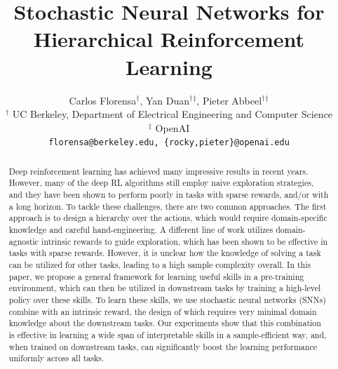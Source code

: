 \documentclass{article} %
\title{Stochastic Neural Networks for \\Hierarchical Reinforcement Learning}
\author{Carlos Florensa${^\dagger}$, Yan Duan${^\dagger}{^\ddagger}$, Pieter Abbeel${^\dagger}{^\ddagger}$ \\
$^\dagger$ UC Berkeley, Department of Electrical Engineering and Computer Science\\
$^\ddagger$ OpenAI\\
\texttt{florensa@berkeley.edu, \{rocky,pieter\}@openai.edu}
}
\begin{document}
	
	\maketitle

\begin{abstract}


Deep reinforcement learning has achieved many impressive results in recent years. However, many of the deep RL algorithms still employ naive exploration strategies, and they have been shown to perform poorly in tasks with sparse rewards, and/or with a long horizon. To tackle these challenges, there are two common approaches. The first approach is to design a hierarchy over the actions, which would require domain-specific knowledge and careful hand-engineering. A different line of work utilizes domain-agnostic intrinsic rewards to guide exploration, which has been shown to be effective in tasks with sparse rewards. However, it is unclear how the knowledge of solving a task can be utilized for other tasks, leading to a high sample complexity overall. In this paper, we propose a general framework for learning useful skills in a pre-training environment, which can then be utilized in downstream tasks by training a high-level policy over these skills. To learn these skills, we use stochastic neural networks (SNNs) combine with an intrinsic reward, the design of which requires very minimal domain knowledge about the downstream tasks. Our experiments show that this combination is effective in learning a wide span of interpretable skills in a sample-efficient way, and, when trained on downstream tasks, can significantly boost the learning performance uniformly across all tasks.

\end{abstract}
\end{document}
